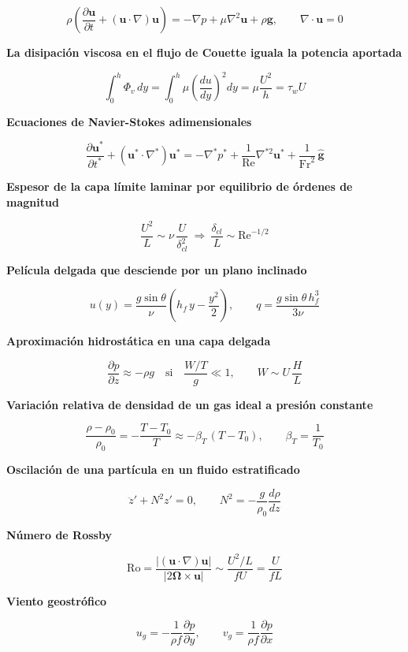 \documentclass[10pt,openany]{book}
\begin{document}
\[
\rho\left(\frac{\partial\mathbf{u}}{\partial t} + (\mathbf{u}\cdot\nabla)\mathbf{u}\right) = -\nabla p + \mu\nabla^{2}\mathbf{u} + \rho\mathbf{g},\qquad \nabla\cdot\mathbf{u} = 0
\]

\noindent\textbf{La disipación viscosa en el flujo de Couette iguala la potencia aportada}

\[
\int_0^{h}\Phi_v\,dy = \int_0^{h}\mu\left(\frac{du}{dy}\right)^{2}dy = \mu\frac{U^{2}}{h} = \tau_w U
\]

\noindent\textbf{Ecuaciones de Navier-Stokes adimensionales}

\[
\frac{\partial\mathbf{u}^{*}}{\partial t^{*}} + (\mathbf{u}^{*}\cdot\nabla^{*})\mathbf{u}^{*} = -\nabla^{*}p^{*} + \frac{1}{\mathrm{Re}}\nabla^{*2}\mathbf{u}^{*} + \frac{1}{\mathrm{Fr}^{2}}\,\hat{\mathbf{g}}
\]

\noindent\textbf{Espesor de la capa límite laminar por equilibrio de órdenes de magnitud}

\[
\frac{U^{2}}{L} \sim \nu\,\frac{U}{\delta_{cl}^{2}}\ \Rightarrow\ \frac{\delta_{cl}}{L} \sim \mathrm{Re}^{-1/2}
\]

\noindent\textbf{Película delgada que desciende por un plano inclinado}

\[
u(y) = \frac{g\sin\theta}{\nu}\left(h_f\,y - \frac{y^{2}}{2}\right),\qquad q = \frac{g\sin\theta\,h_f^{3}}{3\nu}
\]

\noindent\textbf{Aproximación hidrostática en una capa delgada}

\[
\frac{\partial p}{\partial z} \approx -\rho g\quad \text{si}\quad \frac{W/T}{g} \ll 1,\qquad W \sim U\,\frac{H}{L}
\]

\noindent\textbf{Variación relativa de densidad de un gas ideal a presión constante}

\[
\frac{\rho - \rho_0}{\rho_0} = -\frac{T - T_0}{T} \approx -\beta_T\,(T - T_0),\qquad \beta_T = \frac{1}{T_0}
\]

\noindent\textbf{Oscilación de una partícula en un fluido estratificado}

\[
\ddot z' + N^{2} z' = 0,\qquad N^{2} = -\frac{g}{\rho_0}\frac{d\rho}{dz}
\]

\noindent\textbf{Número de Rossby}

\[
\mathrm{Ro} = \frac{|(\mathbf{u}\cdot\nabla)\mathbf{u}|}{|2\boldsymbol{\Omega}\times\mathbf{u}|} \sim \frac{U^{2}/L}{f U} = \frac{U}{f L}
\]

\noindent\textbf{Viento geostrófico}

\[
u_g = -\frac{1}{\rho f}\frac{\partial p}{\partial y},\qquad v_g = \frac{1}{\rho f}\frac{\partial p}{\partial x}
\]
\end{document}

